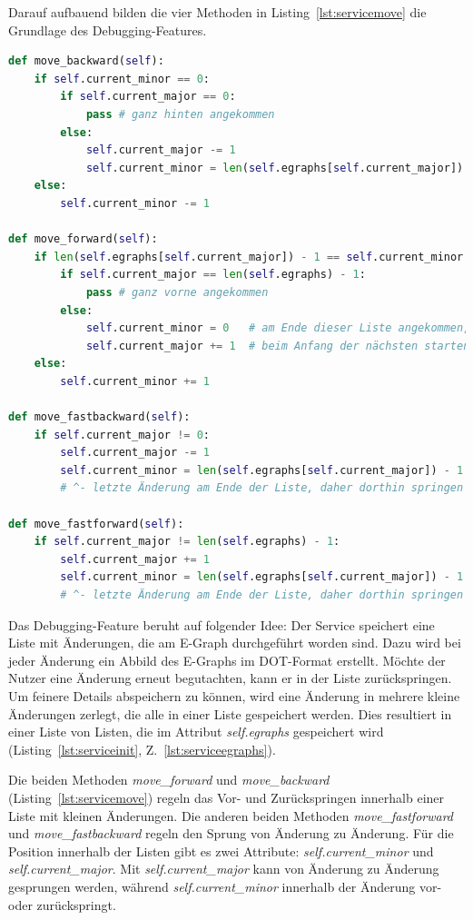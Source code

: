 Darauf aufbauend bilden die vier Methoden in Listing~\ref{lst:servicemove} die Grundlage des Debugging-Features.

\begin{lstlisting}[language=Python, escapechar=|, caption=Methoden für das Debugging aus der Datei \textit{EGraphService.py}, label={lst:servicemove}]
def move_backward(self):
    if self.current_minor == 0:
        if self.current_major == 0:
            pass # ganz hinten angekommen
        else:
            self.current_major -= 1
            self.current_minor = len(self.egraphs[self.current_major]) - 1
    else:
        self.current_minor -= 1

def move_forward(self):
    if len(self.egraphs[self.current_major]) - 1 == self.current_minor:
        if self.current_major == len(self.egraphs) - 1:
            pass # ganz vorne angekommen
        else:
            self.current_minor = 0   # am Ende dieser Liste angekommen,
            self.current_major += 1  # beim Anfang der nächsten starten
    else:
        self.current_minor += 1

def move_fastbackward(self):
    if self.current_major != 0:
        self.current_major -= 1
        self.current_minor = len(self.egraphs[self.current_major]) - 1
        # ^- letzte Änderung am Ende der Liste, daher dorthin springen

def move_fastforward(self):
    if self.current_major != len(self.egraphs) - 1:
        self.current_major += 1
        self.current_minor = len(self.egraphs[self.current_major]) - 1
        # ^- letzte Änderung am Ende der Liste, daher dorthin springen
\end{lstlisting} 

Das Debugging-Feature beruht auf folgender Idee: Der Service speichert eine Liste mit Änderungen, die am E-Graph durchgeführt worden sind.
Dazu wird bei jeder Änderung ein Abbild des E-Graphs im DOT-Format erstellt.
Möchte der Nutzer eine Änderung erneut begutachten, kann er in der Liste zurückspringen. Um feinere Details abspeichern zu können, wird 
eine Änderung in mehrere kleine Änderungen zerlegt, die alle in einer Liste gespeichert werden. Dies resultiert in einer Liste von Listen,
die im Attribut \textit{self.egraphs} gespeichert wird (Listing~\ref{lst:serviceinit}, Z.~\ref{lst:serviceegraphs}).

Die beiden Methoden \textit{move\_forward} und \textit{move\_backward} (Listing~\ref{lst:servicemove}) regeln das Vor- und Zurückspringen innerhalb einer Liste mit kleinen Änderungen.
Die anderen beiden Methoden \textit{move\_fastforward} und \textit{move\_fastbackward} regeln den Sprung von Änderung zu Änderung.
Für die Position innerhalb der Listen gibt es zwei Attribute: \textit{self.current\_minor} und \textit{self.current\_major}. Mit \textit{self.current\_major} kann von Änderung
zu Änderung gesprungen werden, während \textit{self.current\_minor} innerhalb der Änderung vor- oder zurückspringt.

